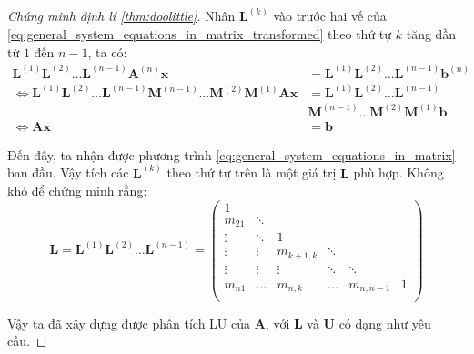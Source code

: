 \documentclass[../../Lectures]{subfiles}
\begin{document}
\begin{proof}[Chứng minh định lí \ref{thm:doolittle}]
    Nhân \(\bm{L}^{(k)}\) vào trước hai vế của
    \eqref{eq:general_system_equations_in_matrix_transformed} theo thứ tự \(k\)
    tăng dần từ \(1\) đến \(n - 1\), ta có:
    \[\begin{split}
                                                       \bm{L}^{(1)} \bm{L}^{(2)} \ldots \bm{L}^{(n - 1)} \bm{A}^{(n)} \bm{x} &= \bm{L}^{(1)} \bm{L}^{(2)} \ldots \bm{L}^{(n - 1)} \bm{b}^{(n)} \\
            \iff \bm{L}^{(1)} \bm{L}^{(2)} \ldots \bm{L}^{(n - 1)} \bm{M}^{(n - 1)} \ldots \bm{M}^{(2)} \bm{M}^{(1)} \bm{Ax} &= \bm{L}^{(1)} \bm{L}^{(2)} \ldots \bm{L}^{(n - 1)} \\
                                                                                                                             & \bm{M}^{(n - 1)} \ldots \bm{M}^{(2)} \bm{M}^{(1)} \bm{b} \\
                                                                                                                \iff \bm{Ax} &= \bm{b}
    \end{split}\]

    Đến đây, ta nhận được phương trình
    \eqref{eq:general_system_equations_in_matrix} ban đầu. Vậy tích các
    \(\bm{L}^{(k)}\) theo thứ tự trên là một giá trị \(\bm{L}\) phù hợp. Không
    khó để chứng minh rằng:
    \[
        \bm{L} = \bm{L}^{(1)} \bm{L}^{(2)} \ldots \bm{L}^{(n - 1)} =
            \begin{pmatrix}
                    1   &          &                &          &                &     \\
                m_{21}  &  \ddots  &                &          &                &     \\
                \vdots  &  \ddots  &        1       &          &                &     \\
                \vdots  &  \vdots  &  m_{k + 1, k}  &  \ddots  &                &     \\
                \vdots  &  \vdots  &     \vdots     &  \ddots  &     \ddots     &     \\
                m_{n1}  &  \dots   &  m_{n, k}      &  \dots   &  m_{n, n - 1}  &  1  \\
            \end{pmatrix}
    \]

    Vậy ta đã xây dựng được phân tích LU của \(\bm{A}\), với \(\bm{L}\) và
    \(\bm{U}\) có dạng như yêu cầu.

\end{proof}
\end{document}
